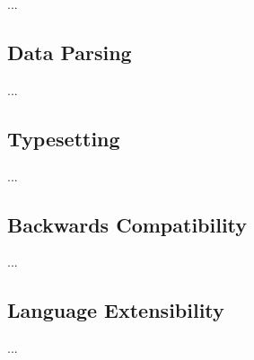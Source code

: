 \documentclass[../report.tex]{subfiles}
\begin{document}









...

\subsection{Data Parsing}

...

\subsection{Typesetting}

...

\subsection{Backwards Compatibility}

...

\subsection{Language Extensibility}

...
\end{document}
